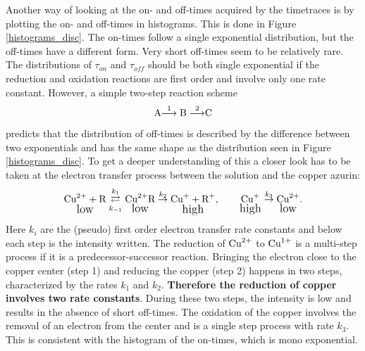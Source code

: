\documentclass[twoside,single]{lion-msc}
\begin{document}
Another way of looking at the on- and off-times acquired by the timetraces is by plotting the on- and off-times in histograms. This is done in Figure \ref{histograms_disc}. The on-times follow a single exponential distribution, but the off-times have a different form. Very short off-times seem to be relatively rare. The distributions of  $\tau_{on}$ and  $\tau_{off}$ should be both single exponential if the reduction and oxidation reactions are first order and involve only one rate constant. However, a simple two-step reaction scheme
\begin{equation}\label{ox_pros}
\textup{A}{\overset{1}{\longrightarrow}\textup{B}\overset{2}{\longrightarrow}}\textup{C}
\end{equation}
predicts that the distribution of off-times is described by the difference between two exponentials \cite{Smiley2006} and has the same shape as the distribution seen in Figure \ref{histograms_disc}. To get a deeper understanding of this a closer look has to be taken at the electron transfer process between the solution and the copper azurin:
\begin{equation}\label{ox_pros}
\underset{\textup{\large low}}{\textup{Cu}^{2+} + \textup{R}} \overset{k_{1}}{\underset{k_{-1}}\rightleftarrows} \underset{\textup{\large low}}{\textup{Cu}^{2+}\textup{R}} \overset{k_{2}}\rightarrow \underset{\textup{\large high}}{\textup{Cu}^{+} + \textup{R}^{+}},  \qquad \underset{\textup{\large high}}{\textup{Cu}^{+}} \overset{k_{3}}\rightarrow \underset{\textup{\large low}}{\textup{Cu}^{2+}}.
\end{equation}
Here $k_{i}$ are the (pseudo) first order electron transfer rate constants and below each step is the intensity written. The reduction of $\textup{Cu}^{2+}$ to $\textup{Cu}^{1+}$ is a multi-step process if it is a predecessor-successor reaction. Bringing the electron close to the copper center (step 1) and reducing the copper (step 2) happens in two steps, characterized by the rates $k_{1}$ and $k_{2}$. \textbf{Therefore the reduction of copper involves two rate constants}. During these two steps, the intensity is low and results in the absence of short off-times. The oxidation of the copper  involves the removal of an electron from the center and is a single step process with rate $k_{3}$. This is consistent with the histogram of the on-times, which is mono exponential.
\end{document}
